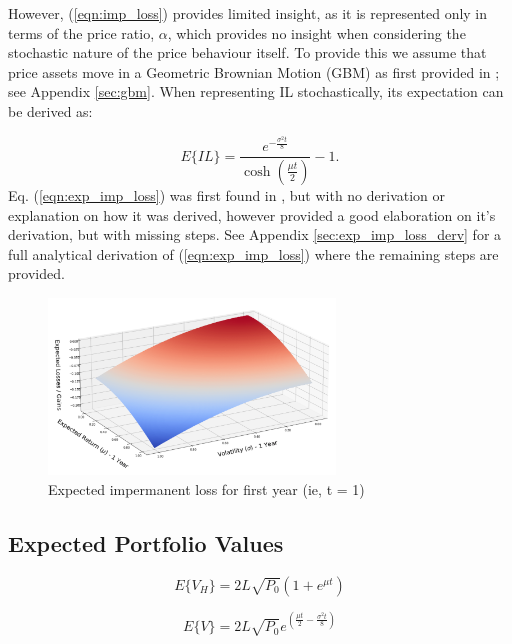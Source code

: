 \documentclass[journal,twocolumn,12pt]{ieeesyscoin}
\begin{document}
However, (\ref{eqn:imp_loss}) provides limited insight, as it is represented only in terms of the price ratio, $\alpha$, which provides no insight when considering the stochastic nature of the price behaviour itself. To provide this we assume that price assets move in a Geometric Brownian Motion (GBM) as first provided in \cite{Gui21}; see Appendix \ref{sec:gbm}. When representing IL stochastically, its expectation can be derived as:

\begin{equation}\label{eqn:exp_imp_loss}
  E\{IL\} = \frac{e^{-\frac{\sigma^2 t}{8}}}{\cosh (\frac{\mu t}{2})} - 1.
\end{equation}
Eq. (\ref{eqn:exp_imp_loss}) was first found in \cite{Gui21}, but with no derivation or explanation on how it was derived, however \cite{Dan22} provided a good elaboration on it's derivation, but with missing steps. See Appendix \ref{sec:exp_imp_loss_derv} for a full analytical derivation of (\ref{eqn:exp_imp_loss}) where the remaining steps are provided.



\begin{figure}[h!]
\includegraphics[width=3in]{img/imp_loss.png}
\caption{Expected impermanent loss for first year (ie, t = 1)} 
\label{fig:daosys_protocol}
\end{figure}

\subsection{Expected Portfolio Values}
\label{sec:exp_portfolio_value}

\lipsum[1]

\begin{equation}\label{eqn:held_portfolio}
  E\{V_{H}\} = 2 L \sqrt{P_{0}} (1 + e^{\mu t})
\end{equation}

\begin{equation}\label{eqn:portfolio_outside}
  E\{V\} = 2 L \sqrt{P_{0}}  e^{(\frac{\mu t}{2} - \frac{\sigma^2 t}{8})}
\end{equation}
\end{document}
